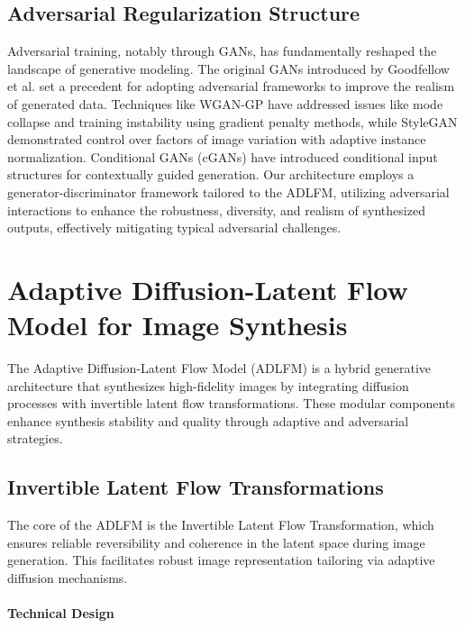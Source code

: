 \documentclass{article} %
\begin{document}
\subsection{Adversarial Regularization Structure}

Adversarial training, notably through GANs, has fundamentally reshaped the landscape of generative modeling. The original GANs introduced by Goodfellow et al. \citep{goodfellow2014generative} set a precedent for adopting adversarial frameworks to improve the realism of generated data. Techniques like WGAN-GP \citep{gulrajani2017improved} have addressed issues like mode collapse and training instability using gradient penalty methods, while StyleGAN \citep{karras2019style} demonstrated control over factors of image variation with adaptive instance normalization. Conditional GANs (cGANs) \citep{mirza2014conditional} have introduced conditional input structures for contextually guided generation. Our architecture employs a generator-discriminator framework tailored to the ADLFM, utilizing adversarial interactions to enhance the robustness, diversity, and realism of synthesized outputs, effectively mitigating typical adversarial challenges.


\section{Adaptive Diffusion-Latent Flow Model for Image Synthesis}

The Adaptive Diffusion-Latent Flow Model (ADLFM) is a hybrid generative architecture that synthesizes high-fidelity images by integrating diffusion processes with invertible latent flow transformations. These modular components enhance synthesis stability and quality through adaptive and adversarial strategies.

\subsection{Invertible Latent Flow Transformations}

The core of the ADLFM is the Invertible Latent Flow Transformation, which ensures reliable reversibility and coherence in the latent space during image generation. This facilitates robust image representation tailoring via adaptive diffusion mechanisms.

\paragraph{Technical Design}
\end{document}
